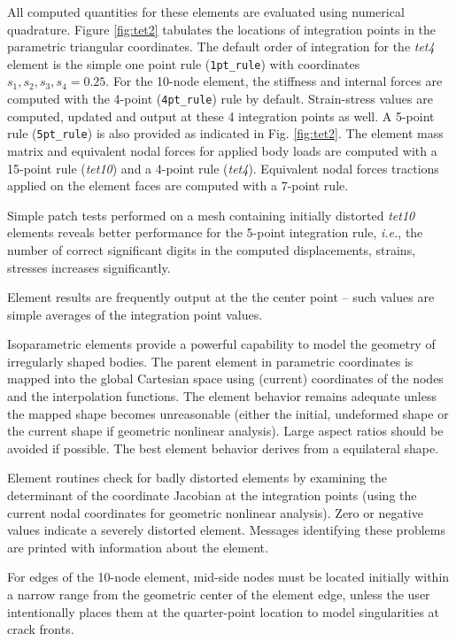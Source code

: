 \documentclass[11pt]{report}
\numberwithin{equation}{section}
\newcommand{\ttt} {\texttt}  %
\newcommand{\ti}{\emph}
\newcommand{\ie}{\emph{i.e.},\xspace}
\newcommand{\tfour}{\ti{tet4}\xspace}
\newcommand{\tten}{\ti{tet10}\xspace}
\begin{document}
All computed quantities for these elements are evaluated using numerical
quadrature. Figure  \ref{fig:tet2} tabulates the locations of integration points in the
parametric triangular coordinates. The default order of integration for the \tfour
element is the simple one point rule (\ttt{1pt\_rule}) with coordinates $s_1, s_2, s_3, s_4=0.25$.
For the 10-node element, the stiffness and internal forces are computed with the 4-point
(\ttt{4pt\_rule}) rule by default. Strain-stress values are computed, updated and output at these
4 integration points as well. A 5-point rule (\ttt{5pt\_rule}) is also provided as indicated in
Fig. \ref{fig:tet2}. The element mass matrix and equivalent nodal forces for applied body
loads are computed with a 15-point rule (\tten) and a 4-point rule (\tfour).
Equivalent nodal forces tractions applied on the element faces are computed with
a 7-point rule.

Simple patch tests performed on a mesh containing initially distorted \tten
elements reveals better performance for the 5-point integration rule, \ie the
number of correct significant digits in the computed displacements, strains,
stresses increases significantly.

Element results are frequently output at the the center point -- such values are simple 
averages of the integration point values.

Isoparametric elements provide a powerful capability to model the geometry of
irregularly shaped bodies. The parent element in parametric coordinates is
mapped into the global Cartesian space using (current) coordinates of the nodes
and the interpolation functions. The element behavior remains adequate unless
the mapped shape becomes unreasonable (either the initial, undeformed shape or
the current shape if geometric nonlinear analysis). Large aspect ratios should
be avoided if possible. The best element behavior derives from a equilateral
shape.

Element routines check for badly distorted elements by examining the determinant
of the coordinate Jacobian at the integration points (using the current nodal
coordinates for geometric nonlinear analysis). Zero or negative values indicate
a severely distorted element. Messages identifying these problems are printed
with information about the element.

For edges of the 10-node element, mid-side nodes must be located initially
within a narrow range from the geometric center of the element edge, unless the
user intentionally places them at the quarter-point location to model
singularities at crack fronts.
\end{document}
